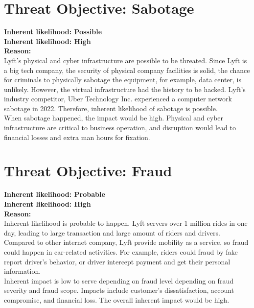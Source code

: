 \documentclass[11pt]{article}
\begin{document}
\section{Threat Objective: Sabotage}


\begin{boxB}
    \textbf{Inherent likelihood: Possible}\\
    \textbf{Inherent likelihood: High}\\
    
    \textbf{Reason: }\\

    Lyft's physical and cyber infrastructure are possible to be threated. Since Lyft is a big tech company, the security of physical company facilities is solid, the chance for criminals to physically sabotage the equipment, for example, data center, is unlikely. However, the virtual infrastructure had the history to be hacked. Lyft's industry competitor, Uber Technology Inc. experienced a computer network sabotage in 2022\cite{Conger_Roose_2022}. Therefore, inherent likelihood of sabotage is possible.\\

    When sabotage happened, the impact would be high. Physical and cyber infrastructure are critical to business operation, and disruption would lead to financial losses and extra man hours for fixation.

\end{boxB}




\section{Threat Objective: Fraud}


\begin{boxB}


    \textbf{Inherent likelihood: Probable}\\
    \textbf{Inherent likelihood: High}\\

    \textbf{Reason:}\\

    Inherent likelihood is probable to happen. Lyft servers over 1 million rides in one day, leading to large transaction and large amount of riders and drivers. Compared to other internet company, Lyft provide mobility as a service, so fraud could happen in car-related activities. For example, riders could fraud by fake report driver's behavior, or driver intercept payment and get their personal information. \\

    Inherent impact is low to serve depending on fraud level depending on fraud severity and  fraud scope. Impacts include customer's dissatisfaction, account compromise, and financial loss. The overall inherent  impact would be high.
    
\end{boxB}
\end{document}
